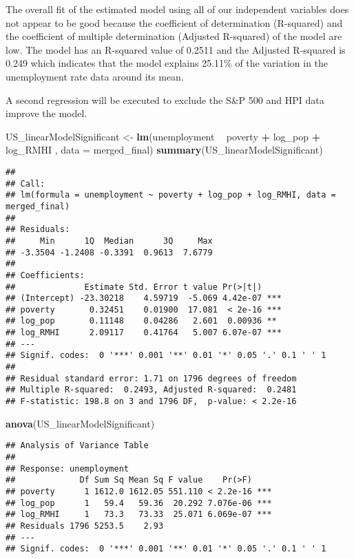 \documentclass[
]{article}
\newenvironment{Shaded}{\begin{snugshade}}{\end{snugshade}}
\newcommand{\DataTypeTok}[1]{\textcolor[rgb]{0.13,0.29,0.53}{#1}}
\newcommand{\KeywordTok}[1]{\textcolor[rgb]{0.13,0.29,0.53}{\textbf{#1}}}
\newcommand{\NormalTok}[1]{#1}
\newcommand{\OperatorTok}[1]{\textcolor[rgb]{0.81,0.36,0.00}{\textbf{#1}}}
\newcommand{\StringTok}[1]{\textcolor[rgb]{0.31,0.60,0.02}{#1}}
\begin{document}
The overall fit of the estimated model using all of our independent
variables does not appear to be good because the coefficient of
determination (R-squared) and the coefficient of multiple determination
(Adjusted R-squared) of the model are low. The model has an R-squared
value of 0.2511 and the Adjusted R-squared is 0.249 which indicates that
the model explains 25.11\% of the variation in the unemployment rate
data around its mean.

A second regression will be executed to exclude the S\&P 500 and HPI
data improve the model.

\begin{Shaded}
\begin{Highlighting}[]
\NormalTok{US_linearModelSignificant <-}\StringTok{ }\KeywordTok{lm}\NormalTok{(unemployment }\OperatorTok{~}\StringTok{ }\NormalTok{poverty }\OperatorTok{+}\StringTok{ }\NormalTok{log_pop }\OperatorTok{+}\StringTok{ }\NormalTok{log_RMHI , }\DataTypeTok{data =}\NormalTok{ merged_final)}
\KeywordTok{summary}\NormalTok{(US_linearModelSignificant)}
\end{Highlighting}
\end{Shaded}

\begin{verbatim}
## 
## Call:
## lm(formula = unemployment ~ poverty + log_pop + log_RMHI, data = merged_final)
## 
## Residuals:
##     Min      1Q  Median      3Q     Max 
## -3.3504 -1.2408 -0.3391  0.9613  7.6779 
## 
## Coefficients:
##              Estimate Std. Error t value Pr(>|t|)    
## (Intercept) -23.30218    4.59719  -5.069 4.42e-07 ***
## poverty       0.32451    0.01900  17.081  < 2e-16 ***
## log_pop       0.11148    0.04286   2.601  0.00936 ** 
## log_RMHI      2.09117    0.41764   5.007 6.07e-07 ***
## ---
## Signif. codes:  0 '***' 0.001 '**' 0.01 '*' 0.05 '.' 0.1 ' ' 1
## 
## Residual standard error: 1.71 on 1796 degrees of freedom
## Multiple R-squared:  0.2493, Adjusted R-squared:  0.2481 
## F-statistic: 198.8 on 3 and 1796 DF,  p-value: < 2.2e-16
\end{verbatim}

\begin{Shaded}
\begin{Highlighting}[]
\KeywordTok{anova}\NormalTok{(US_linearModelSignificant)}
\end{Highlighting}
\end{Shaded}

\begin{verbatim}
## Analysis of Variance Table
## 
## Response: unemployment
##             Df Sum Sq Mean Sq F value    Pr(>F)    
## poverty      1 1612.0 1612.05 551.110 < 2.2e-16 ***
## log_pop      1   59.4   59.36  20.292 7.076e-06 ***
## log_RMHI     1   73.3   73.33  25.071 6.069e-07 ***
## Residuals 1796 5253.5    2.93                      
## ---
## Signif. codes:  0 '***' 0.001 '**' 0.01 '*' 0.05 '.' 0.1 ' ' 1
\end{verbatim}
\end{document}

